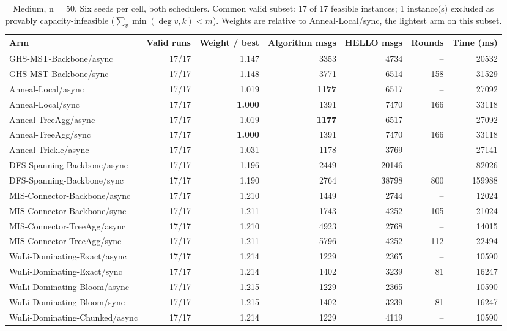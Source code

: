 \begin{table}[tb]
\centering
\caption{Medium, n = 50. Six seeds per cell, both schedulers. Common valid subset: 17 of 17 feasible instances; 1 instance(s) excluded as provably capacity-infeasible ($\sum_v \min(\deg v, k) < m$). Weights are relative to Anneal-Local/sync, the lightest arm on this subset.}
\label{tab:cmp-sweep_medium_n50_k6_join_v2}
\begin{tabular}{lrrrrrr}
\toprule
Arm & Valid runs & Weight / best & Algorithm msgs & HELLO msgs & Rounds & Time (ms) \\
\midrule
GHS-MST-Backbone/async & 17/17 & 1.147 & 3353 & 4734 & -- & 20532 \\
GHS-MST-Backbone/sync & 17/17 & 1.148 & 3771 & 6514 & 158 & 31529 \\
Anneal-Local/async & 17/17 & 1.019 & \textbf{1177} & 6517 & -- & 27092 \\
Anneal-Local/sync & 17/17 & \textbf{1.000} & 1391 & 7470 & 166 & 33118 \\
Anneal-TreeAgg/async & 17/17 & 1.019 & \textbf{1177} & 6517 & -- & 27092 \\
Anneal-TreeAgg/sync & 17/17 & \textbf{1.000} & 1391 & 7470 & 166 & 33118 \\
Anneal-Trickle/async & 17/17 & 1.031 & 1178 & 3769 & -- & 27141 \\
DFS-Spanning-Backbone/async & 17/17 & 1.196 & 2449 & 20146 & -- & 82026 \\
DFS-Spanning-Backbone/sync & 17/17 & 1.190 & 2764 & 38798 & 800 & 159988 \\
MIS-Connector-Backbone/async & 17/17 & 1.210 & 1449 & 2744 & -- & 12024 \\
MIS-Connector-Backbone/sync & 17/17 & 1.211 & 1743 & 4252 & 105 & 21024 \\
MIS-Connector-TreeAgg/async & 17/17 & 1.210 & 4923 & 2768 & -- & 14015 \\
MIS-Connector-TreeAgg/sync & 17/17 & 1.211 & 5796 & 4252 & 112 & 22494 \\
WuLi-Dominating-Exact/async & 17/17 & 1.214 & 1229 & 2365 & -- & 10590 \\
WuLi-Dominating-Exact/sync & 17/17 & 1.214 & 1402 & 3239 & 81 & 16247 \\
WuLi-Dominating-Bloom/async & 17/17 & 1.215 & 1229 & 2365 & -- & 10590 \\
WuLi-Dominating-Bloom/sync & 17/17 & 1.215 & 1402 & 3239 & 81 & 16247 \\
WuLi-Dominating-Chunked/async & 17/17 & 1.214 & 1229 & 4119 & -- & 10590 \\

\end{tabular}
\end{table}
